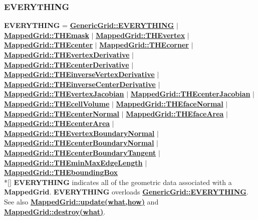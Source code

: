 \documentclass{article}
\begin{document}
  \subsubsection{EVERYTHING}
  \label{MappedGrid::EVERYTHING}
    \textbf{EVERYTHING}
    =      {\bf{}\hyperref{GenericGrid::EVERYTHING}{GenericGrid::EVERYTHING \rm(\S}{)}{GenericGrid::EVERYTHING}}
    $\mid$ {\bf{}\hyperref{THEmask}{THEmask \rm(\S}{)}{MappedGrid::THEmask}}
    $\mid$ {\bf{}\hyperref{THEvertex}{THEvertex \rm(\S}{)}{MappedGrid::THEvertex}}
    $\mid$ {\bf{}\hyperref{THEcenter}{THEcenter \rm(\S}{)}{MappedGrid::THEcenter}}
    $\mid$ {\bf{}\hyperref{THEcorner}{THEcorner \rm(\S}{)}{MappedGrid::THEcorner}}
    $\mid$ {\bf{}\hyperref{THEvertexDerivative}{THEvertexDerivative \rm(\S}{)}{MappedGrid::THEvertexDerivative}}
    $\mid$ {\bf{}\hyperref{THEcenterDerivative}{THEcenterDerivative \rm(\S}{)}{MappedGrid::THEcenterDerivative}}
    $\mid$ {\bf{}\hyperref{THEinverseVertexDerivative}{THEinverseVertexDerivative \rm(\S}{)}{MappedGrid::THEinverseVertexDerivative}}
    $\mid$ {\bf{}\hyperref{THEinverseCenterDerivative}{THEinverseCenterDerivative \rm(\S}{)}{MappedGrid::THEinverseCenterDerivative}}
    $\mid$ {\bf{}\hyperref{THEvertexJacobian}{THEvertexJacobian \rm(\S}{)}{MappedGrid::THEvertexJacobian}}
    $\mid$ {\bf{}\hyperref{THEcenterJacobian}{THEcenterJacobian \rm(\S}{)}{MappedGrid::THEcenterJacobian}}
    $\mid$ {\bf{}\hyperref{THEcellVolume}{THEcellVolume \rm(\S}{)}{MappedGrid::THEcellVolume}}
    $\mid$ {\bf{}\hyperref{THEfaceNormal}{THEfaceNormal \rm(\S}{)}{MappedGrid::THEfaceNormal}}
    $\mid$ {\bf{}\hyperref{THEcenterNormal}{THEcenterNormal \rm(\S}{)}{MappedGrid::THEcenterNormal}}
    $\mid$ {\bf{}\hyperref{THEfaceArea}{THEfaceArea \rm(\S}{)}{MappedGrid::THEfaceArea}}
    $\mid$ {\bf{}\hyperref{THEcenterArea}{THEcenterArea \rm(\S}{)}{MappedGrid::THEcenterArea}}
    $\mid$ {\bf{}\hyperref{THEvertexBoundaryNormal}{THEvertexBoundaryNormal \rm(\S}{)}{MappedGrid::THEvertexBoundaryNormal}}
    $\mid$ {\bf{}\hyperref{THEcenterBoundaryNormal}{THEcenterBoundaryNormal \rm(\S}{)}{MappedGrid::THEcenterBoundaryNormal}}
    $\mid$ {\bf{}\hyperref{THEcenterBoundaryTangent}{THEcenterBoundaryTangent \rm(\S}{)}{MappedGrid::THEcenterBoundaryTangent}}
    $\mid$ {\bf{}\hyperref{THEminMaxEdgeLength}{THEminMaxEdgeLength \rm(\S}{)}{MappedGrid::THEminMaxEdgeLength}}
    $\mid$ {\bf{}\hyperref{THEboundingBox}{THEboundingBox \rm(\S}{)}{MappedGrid::THEboundingBox}} \\*[\parskip]
    \textbf{EVERYTHING} indicates all of the geometric data associated with a \textbf{MappedGrid}.
    \textbf{EVERYTHING} overloads
    {\bf{}\hyperref{GenericGrid::EVERYTHING}{GenericGrid::EVERYTHING \rm(\S}{)}{GenericGrid::EVERYTHING}}.
    See also {\bf{}\hyperref{update(what,how)}{update(what,how) \rm(\S}{)}{MappedGrid::update(what,how)}}
    and {\bf{}\hyperref{destroy(what)}{destroy(what) \rm(\S}{)}{MappedGrid::destroy(what)}}.
\end{document}
